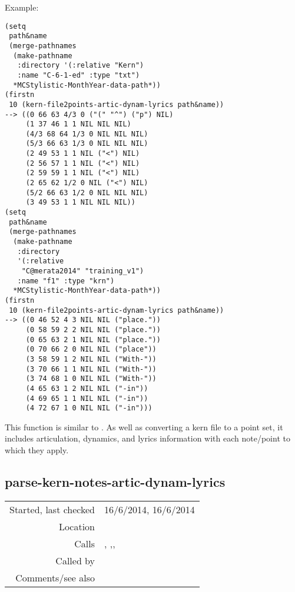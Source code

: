 \vspace{0.5cm}
\noindent Example:
\begin{verbatim}
(setq
 path&name
 (merge-pathnames
  (make-pathname
   :directory '(:relative "Kern")
   :name "C-6-1-ed" :type "txt")
  *MCStylistic-MonthYear-data-path*))
(firstn
 10 (kern-file2points-artic-dynam-lyrics path&name))
--> ((0 66 63 4/3 0 ("(" "^") ("p") NIL)
     (1 37 46 1 1 NIL NIL NIL)
     (4/3 68 64 1/3 0 NIL NIL NIL)
     (5/3 66 63 1/3 0 NIL NIL NIL)
     (2 49 53 1 1 NIL ("<") NIL)
     (2 56 57 1 1 NIL ("<") NIL)
     (2 59 59 1 1 NIL ("<") NIL)
     (2 65 62 1/2 0 NIL ("<") NIL)
     (5/2 66 63 1/2 0 NIL NIL NIL)
     (3 49 53 1 1 NIL NIL NIL))
(setq
 path&name
 (merge-pathnames
  (make-pathname
   :directory
   '(:relative
    "C@merata2014" "training_v1")
   :name "f1" :type "krn")
  *MCStylistic-MonthYear-data-path*))
(firstn
 10 (kern-file2points-artic-dynam-lyrics path&name))
--> ((0 46 52 4 3 NIL NIL ("place."))
     (0 58 59 2 2 NIL NIL ("place."))
     (0 65 63 2 1 NIL NIL ("place."))
     (0 70 66 2 0 NIL NIL ("place"))
     (3 58 59 1 2 NIL NIL ("With-"))
     (3 70 66 1 1 NIL NIL ("With-"))
     (3 74 68 1 0 NIL NIL ("With-"))
     (4 65 63 1 2 NIL NIL ("-in"))
     (4 69 65 1 1 NIL NIL ("-in"))
     (4 72 67 1 0 NIL NIL ("-in")))
\end{verbatim}

\noindent This function is similar to
. As well as
converting a kern file to a point set, it includes
articulation, dynamics, and lyrics information with
each note/point to which they apply.


\subsection*{parse-kern-notes-artic-dynam-lyrics}\label{fun:parse-kern-notes-artic-dynam-lyrics}

\vspace{0.3cm}
\begin{tabular}{r|p{8cm}}
Started, last checked & 16/6/2014, 16/6/2014 \\
Location & \nameref{sec:kern-articulation} \\
Calls & \nameref{fun:articulation-string2list}, \nameref{fun:dynamics-string2list},\newline \nameref{fun:kern-tie-dur-pitch2list}, \newline \nameref{fun:pitch-and-octave2MIDI-morphetic-pair} \\
Called by & \nameref{fun:kern-cols2points-artic-dynam-lyrics} \\
Comments/see also &
\end{tabular}

